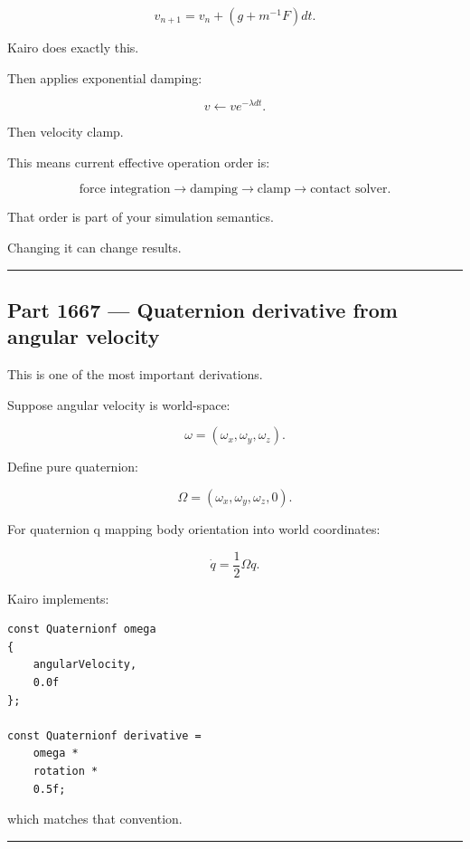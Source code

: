 \[
\boxed{
v_{n+1}
=
v_n+
\left(
g+m^{-1}F
\right)dt.
}
\]

Kairo does exactly this.

Then applies exponential damping:

\[
v
\leftarrow
ve^{-\lambda dt}.
\]

Then velocity clamp.

This means current effective operation order is:

\[
\text{force integration}
\rightarrow
\text{damping}
\rightarrow
\text{clamp}
\rightarrow
\text{contact solver}.
\]

That order is part of your simulation semantics.

Changing it can change results.

\begin{center}\rule{0.5\linewidth}{0.5pt}\end{center}

\subsection{Part 1667 --- Quaternion derivative from angular velocity}\label{06-engine-ii-ch037-part-1667-quaternion-derivative-from-angular-velocity}

\hypertarget{06-engine-ii-ch037-part-1667-quaternion-derivative-from-angular-velocity}{}

This is one of the most important derivations.

Suppose angular velocity is world-space:

\[
\omega=
(\omega_x,\omega_y,\omega_z).
\]

Define pure quaternion:

\[
\Omega
=
(\omega_x,\omega_y,\omega_z,0).
\]

For quaternion q mapping body orientation into world coordinates:

\[
\boxed{
\dot q
=
\frac12
\Omega q.
}
\]

Kairo implements:

\begin{verbatim}
const Quaternionf omega
{
    angularVelocity,
    0.0f
};

const Quaternionf derivative =
    omega *
    rotation *
    0.5f;
\end{verbatim}

which matches that convention.

\begin{center}\rule{0.5\linewidth}{0.5pt}\end{center}


